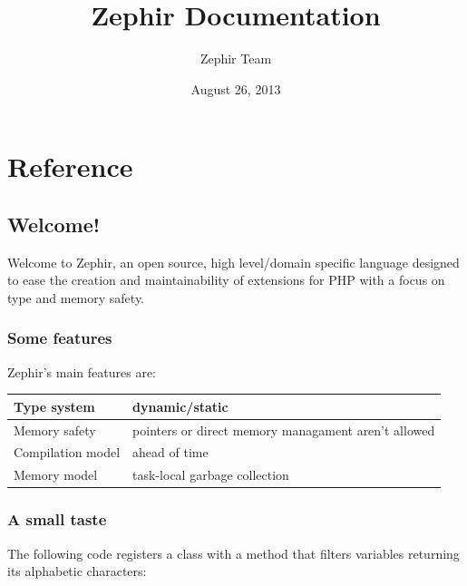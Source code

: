 \documentclass[letterpaper,10pt,english]{sphinxmanual}
\title{Zephir Documentation}
\date{August 26, 2013}
\author{Zephir Team}
\begin{document}
\maketitle
\tableofcontents
{}\label{index::doc}



\chapter{Reference}
\label{index:zephir-language}\label{index:reference}

\section{Welcome!}
\label{welcome:welcome}\label{welcome::doc}
Welcome to Zephir, an open source, high level/domain specific language
designed to ease the creation and maintainability of extensions for PHP
with a focus on type and memory safety.


\subsection{Some features}
\label{welcome:some-features}
Zephir's main features are:

\begin{tabulary}{\linewidth}{|L|L|}
\hline

Type system
 & 
dynamic/static
\\\hline

Memory safety
 & 
pointers or direct memory managament aren't allowed
\\\hline

Compilation model
 & 
ahead of time
\\\hline

Memory model
 & 
task-local garbage collection
\\\hline
\end{tabulary}



\subsection{A small taste}
\label{welcome:a-small-taste}
The following code registers a class with a method that filters variables returning its
alphabetic characters:
\end{document}
